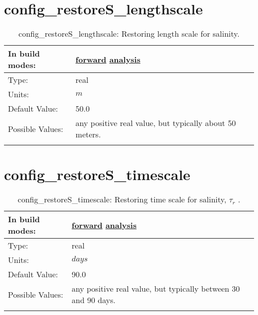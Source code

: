 \section[config\_restoreS\_lengthscale]{config\_restoreS\_lengthscale}
\label{sec:nm_sec_config_restoreS_lengthscale}
\begin{center}
\begin{longtable}{| p{2.0in} || p{4.0in} |}
    \hline
    In build modes: & \hyperref[subsec:forward_nm_tab_forcing]{forward} \hyperref[subsec:analysis_nm_tab_forcing]{analysis} \\
    \hline
    Type: & real \\
    \hline
    Units: & $m$ \\
    \hline
    Default Value: & 50.0 \\
    \hline
    Possible Values: & any positive real value, but typically about 50 meters. \\
    \hline
    \caption{config\_restoreS\_lengthscale: Restoring length scale for salinity.}
\end{longtable}
\end{center}
\section[config\_restoreS\_timescale]{config\_restoreS\_timescale}
\label{sec:nm_sec_config_restoreS_timescale}
\begin{center}
\begin{longtable}{| p{2.0in} || p{4.0in} |}
    \hline
    In build modes: & \hyperref[subsec:forward_nm_tab_forcing]{forward} \hyperref[subsec:analysis_nm_tab_forcing]{analysis} \\
    \hline
    Type: & real \\
    \hline
    Units: & $days$ \\
    \hline
    Default Value: & 90.0 \\
    \hline
    Possible Values: & any positive real value, but typically between 30 and 90 days. \\
    \hline
    \caption{config\_restoreS\_timescale:  Restoring time scale for salinity,  $\tau_r$ .}
\end{longtable}
\end{center}
